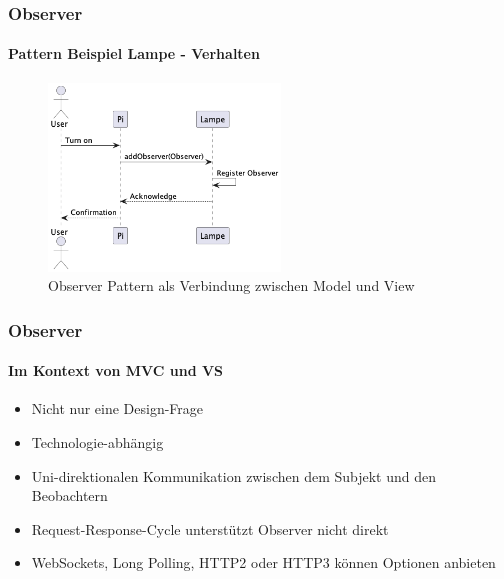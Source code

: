 \begin{frame}
  \frametitle{Observer}
  \framesubtitle{Pattern Beispiel Lampe - Verhalten}
  \begin{figure}[ht]
    \centering
    \includegraphics[width=0.55\textwidth]{fig/uml/seq-mvc-observer.png}
    \caption{Observer Pattern als Verbindung zwischen Model und View}
    \label{fig:seq-mvc-observer}
  \end{figure}
\end{frame}

\begin{frame}
  \frametitle{Observer}
  \framesubtitle{Im Kontext von MVC und VS}
  \begin{itemize}
    \item Nicht nur eine Design-Frage
    \item Technologie-abhängig
    \item Uni-direktionalen Kommunikation zwischen dem Subjekt und den Beobachtern
    \item Request-Response-Cycle unterstützt Observer nicht direkt
    \item WebSockets, Long Polling, HTTP2 oder HTTP3 können Optionen anbieten
  \end{itemize}
\end{frame}